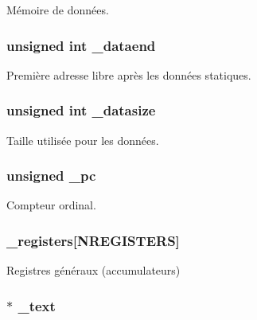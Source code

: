 \-Mémoire de données. 

\hypertarget{struct_machine_a6672a65c5a3319e5d1dc646d6c4e720f}{
\subsubsection[{\-\_\-dataend}]{\setlength{\rightskip}{0pt plus 5cm}unsigned int {\bf \-\_\-dataend}}}\label{struct_machine_a6672a65c5a3319e5d1dc646d6c4e720f}


\-Première adresse libre après les données statiques. 

\hypertarget{struct_machine_a45bdca8bd79802ec21021ab3a6ef8e2c}{
\subsubsection[{\-\_\-datasize}]{\setlength{\rightskip}{0pt plus 5cm}unsigned int {\bf \-\_\-datasize}}}\label{struct_machine_a45bdca8bd79802ec21021ab3a6ef8e2c}


\-Taille utilisée pour les données. 

\hypertarget{struct_machine_aeb680839a66dd8d6eb8e0f5971462b9a}{
\subsubsection[{\-\_\-pc}]{\setlength{\rightskip}{0pt plus 5cm}unsigned {\bf \-\_\-pc}}}\label{struct_machine_aeb680839a66dd8d6eb8e0f5971462b9a}


\-Compteur ordinal. 

\hypertarget{struct_machine_a2275469edc6c6cd7ecb8d75ec745d41f}{
\subsubsection[{\-\_\-registers}]{ {\bf \-\_\-registers}\mbox{[}{\bf \-N\-R\-E\-G\-I\-S\-T\-E\-R\-S}\mbox{]}}}\label{struct_machine_a2275469edc6c6cd7ecb8d75ec745d41f}


\-Registres généraux (accumulateurs) 

\hypertarget{struct_machine_ac3249102d1999b98e27e51867198e39a}{
\subsubsection[{\-\_\-text}]{$\ast$ {\bf \-\_\-text}}}\label{struct_machine_ac3249102d1999b98e27e51867198e39a}


